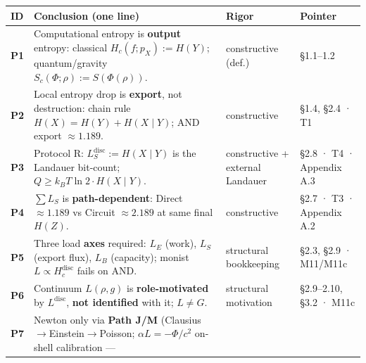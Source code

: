 \documentclass[
  11pt,
]{article}
\newcounter{none} %
\begin{document}
{\def\LTcaptype{none} %
\begin{longtable}[]{@{}
  >{\raggedright\arraybackslash}p{}
  >{\raggedright\arraybackslash}p{}
  >{\raggedright\arraybackslash}p{}
  >{\raggedright\arraybackslash}p{}@{}}
\toprule\noalign{}
\begin{minipage}[b]{\linewidth}\raggedright
ID
\end{minipage} & \begin{minipage}[b]{\linewidth}\raggedright
Conclusion (one line)
\end{minipage} & \begin{minipage}[b]{\linewidth}\raggedright
Rigor
\end{minipage} & \begin{minipage}[b]{\linewidth}\raggedright
Pointer
\end{minipage} \\
\midrule\noalign{}
\endhead
\bottomrule\noalign{}
\endlastfoot
\textbf{P1} & Computational entropy is \textbf{output} entropy:
classical \(H_c(f;p_X):=H(Y)\); quantum/gravity
\(S_c(\Phi;\rho):=S(\Phi(\rho))\). & constructive (def.) & §1.1--1.2 \\
\textbf{P2} & Local entropy drop is \textbf{export}, not destruction:
chain rule \(H(X)=H(Y)+H(X\mid Y)\); AND export \(\approx 1.189\). &
constructive & §1.4, §2.4 · T1 \\
\textbf{P3} & Protocol R: \(L_S^{\mathrm{disc}}:=H(X\mid Y)\) is the
Landauer bit-count; \(Q\ge k_B T\ln 2\cdot H(X\mid Y)\). & constructive
+ external Landauer & §2.8 · T4 · Appendix A.3 \\
\textbf{P4} & \(\sum L_S\) is \textbf{path-dependent}: Direct
\(\approx 1.189\) vs Circuit \(\approx 2.189\) at same final \(H(Z)\). &
constructive & §2.7 · T3 · Appendix A.2 \\
\textbf{P5} & Three load \textbf{axes} required: \(L_E\) (work), \(L_S\)
(export flux), \(L_B\) (capacity); monist
\(L\propto H_c^{\mathrm{disc}}\) fails on AND. & structural bookkeeping
& §2.3, §2.9 · M11/M11c \\
\textbf{P6} & Continuum \(L(\rho,g)\) is \textbf{role-motivated} by
\(L^{\mathrm{disc}}\), \textbf{not identified} with it; \(L\neq G\). &
structural motivation & §2.9--2.10, §3.2 · M11c \\
\textbf{P7} & Newton only via \textbf{Path J/M}
(Clausius$\to$Einstein$\to$Poisson; \(\alpha L=-\Phi/c^2\) on-shell calibration ---

\end{longtable}}
\end{document}
